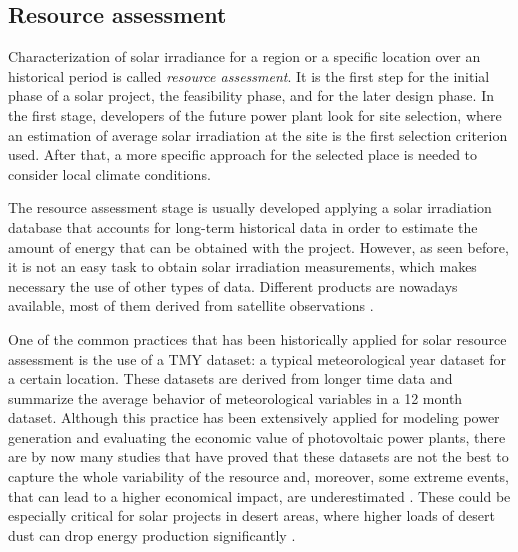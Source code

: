 \subsection{Resource assessment}

Characterization of solar irradiance for a region or a specific location over an historical period is called \textit{resource assessment}. It is the first step for the initial phase of a solar project, the feasibility phase, and for the later design phase. In the first stage, developers of the future power plant look for site selection, where an estimation of average solar irradiation at the site is the first selection criterion used. After that, a more specific approach for the selected place is needed to consider local climate conditions.

The resource assessment stage is usually developed applying a solar irradiation database that accounts for long-term historical data in order to estimate the amount of energy that can be obtained with the project. However, as seen before, it is not an easy task to obtain solar irradiation measurements, which makes necessary the use of other types of data. Different products are nowadays available, most of them derived from satellite observations \cite*{nrel}.



One of the common practices that has been historically applied for solar resource assessment is the use of a TMY dataset: a typical meteorological year dataset for a certain location. These datasets are derived from longer time data and summarize the average behavior of meteorological variables in a 12 month dataset. Although this practice has been extensively applied for modeling power generation and evaluating the economic value of photovoltaic power plants, there are by now many studies that have proved that these datasets are not the best to capture the whole variability of the resource and, moreover, some extreme events, that can lead to a higher economical impact, are underestimated \cite*{Bryce2018, vignola2012b, nrel}. These could be especially critical for solar projects in desert areas, where higher loads of desert dust can drop energy production significantly \cite*{gueymard2014review}.

